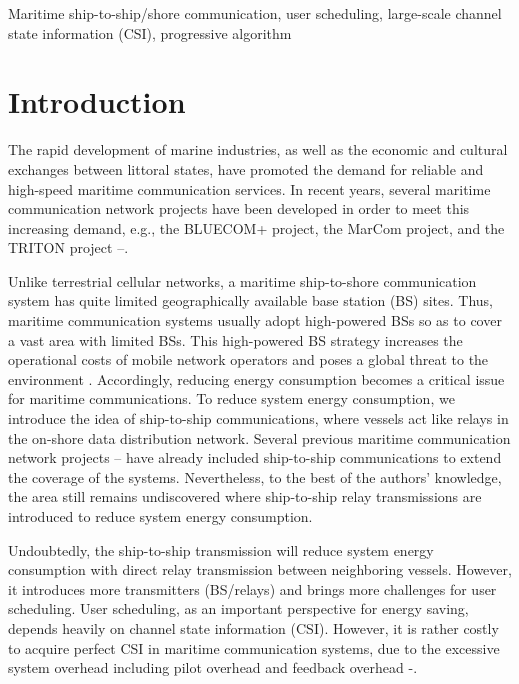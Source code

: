 \documentclass[journal]{IEEEtran}
\begin{document}
   \begin{IEEEkeywords}
   Maritime ship-to-ship/shore communication, user scheduling, large-scale channel state information (CSI), progressive algorithm
   \end{IEEEkeywords}
  
   
   \section{Introduction}\label{sec:1}
  
   The rapid development of marine industries, as well as the economic and cultural exchanges between littoral states, have promoted the demand for reliable and high-speed maritime communication services. In recent years, several maritime communication network projects have been developed in order to meet this increasing demand, e.g., the BLUECOM+ project, the MarCom project, and the TRITON project \cite{p321}--\cite{p32}. 
   
   Unlike terrestrial cellular networks, a maritime ship-to-shore communication system has quite limited geographically available base station (BS) sites. Thus, maritime communication systems usually adopt high-powered BSs so as to cover a vast area with limited BSs. This high-powered BS strategy increases the operational costs of mobile network operators and poses a global threat to the environment \cite{p33}.
   Accordingly, reducing energy consumption becomes a critical issue for maritime communications. 
   To reduce system energy consumption, we introduce the idea of ship-to-ship communications, where vessels act like relays in the on-shore data distribution network. Several previous maritime communication network projects \cite{p321}--\cite{p32} have already included ship-to-ship communications to extend the coverage of the systems. Nevertheless, to the best of the authors' knowledge, the area still remains undiscovered where ship-to-ship relay transmissions are introduced to reduce system energy consumption. 
  
   Undoubtedly, the ship-to-ship transmission will reduce system energy consumption with direct relay transmission between neighboring vessels. 
   However, it introduces more transmitters (BS/relays) and brings more challenges for user scheduling. %
   User scheduling, as an important perspective for energy saving, depends heavily on channel state information (CSI). However, it is rather costly to acquire perfect CSI in maritime communication systems, due to the excessive system overhead including pilot overhead and feedback overhead \cite{p403}-\cite{p407}. %
   
\end{document}
